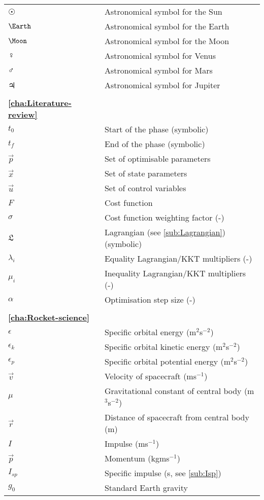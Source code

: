 \begin{longtable}{l p{}}
$\Sun$ & Astronomical symbol for the Sun \\
$\Earth$ & Astronomical symbol for the Earth \\
$\Moon$ & Astronomical symbol for the Moon \\
$\Venus$ & Astronomical symbol for Venus \\
$\Mars$ & Astronomical symbol for Mars \\
$\Jupiter$ & Astronomical symbol for Jupiter \\
\\
\textbf{\autoref{cha:Literature-review}} \\
$t_0$ & Start of the phase (symbolic) \\
$t_f$ & End of the phase (symbolic) \\
$\vec{p}$ & Set of optimisable parameters \\
$\vec{x}$ & Set of state parameters \\
$\vec{u}$ & Set of control variables \\
$F$ & Cost function \\
$\sigma$ & Cost function weighting factor (-) \\
$\mathfrak{L}$ & Lagrangian (see \autoref{sub:Lagrangian}) (symbolic) \\
$\lambda_i$ & Equality Lagrangian/KKT multipliers (-) \\
$\mu_i$ & Inequality Lagrangian/KKT multipliers (-) \\
$\alpha$ & Optimisation step size (-) \\
\\
\textbf{\autoref{cha:Rocket-science}} \\
$\epsilon$ & Specific orbital energy (m$^2$s$^{-2}$) \\
$\epsilon_k$ & Specific orbital kinetic energy (m$^2$s$^{-2}$) \\
$\epsilon_p$ & Specific orbital potential energy (m$^2$s$^{-2}$) \\
$\vec{v}$ & Velocity of spacecraft (ms$^{-1}$) \\
$\mu$ & Gravitational constant of central body (m$^3$s$^{-2}$) \\
$\vec{r}$ & Distance of spacecraft from central body (m) \\
$I$ & Impulse (ms$^{-1}$) \\
$\vec{p}$ & Momentum (kgms$^{-1}$) \\
$I_{sp}$ & Specific impulse (s, see \autoref{sub:Isp}) \\
$g_0$ & Standard Earth gravity \parencite[9.80665~ms$^{-2}$,][]{CGPM} \\

\end{longtable}
